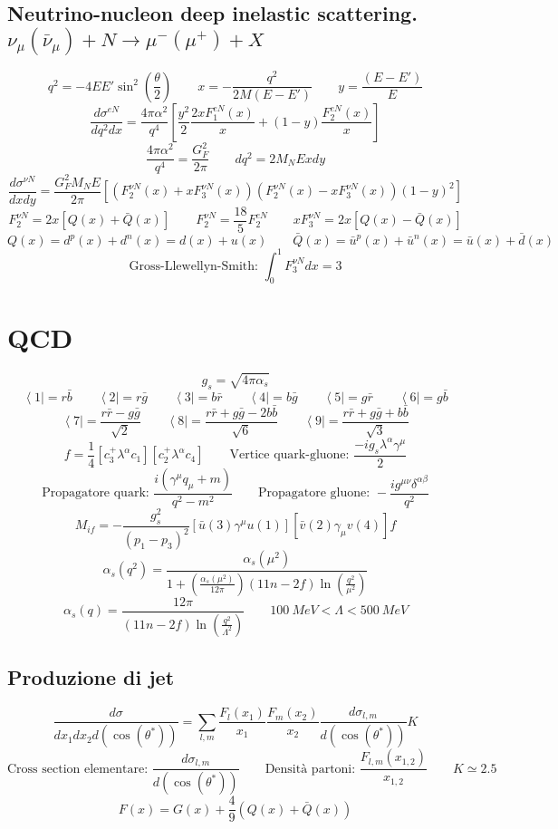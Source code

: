 \documentclass[10pt, onecolumn, a4paper]{article}
\def\({\left(}
\def\){\right)}
\def\[{\left[}
\def\]{\right]}
\def\<{\left<}
\begin{document}
\subsection{Neutrino-nucleon deep inelastic scattering. $\nu_{\mu}\(\bar\nu_{\mu}\)+N\to \mu^-\(\mu^+\)+X$} %
$$q^2=-4EE'\sin^2{\(\frac{\theta}{2}\)} \qquad x=-\frac{q^2}{2M\(E-E'\)} \qquad y=\frac{\(E-E'\)}{E}$$
$$\frac{d\sigma^{eN}}{dq^2dx}=\frac{4\pi\alpha^2}{q^4}\[\frac{y^2}{2}\frac{2xF_1^{eN}\(x\)}{x}+\(1-y\)\frac{F_2^{eN}\(x\)}{x}\]$$
$$\frac{4\pi\alpha^2}{q^4}=\frac{G_F^2}{2\pi} \qquad dq^2=2M_NExdy$$
$$\frac{d\sigma^{\nu N}}{dxdy}=\frac{G_F^2M_NE}{2\pi}\[\(F_2^{\nu N}\(x\)+xF_3^{\nu N}\(x\)\)\(F_2^{\nu N}\(x\)-xF_3^{\nu N}\(x\)\)\(1-y\)^2\]$$
$$F_2^{\nu N}=2x\[Q\(x\)+\bar Q\(x\)\] \qquad F_2^{\nu N}=\frac{18}{5}F_2^{eN} \qquad xF_3^{\nu N}=2x\[Q\(x\)-\bar Q\(x\)\]$$
$$Q\(x\)=d^p\(x\)+d^n\(x\)=d\(x\)+u\(x\) \qquad \bar Q\(x\)=\bar u^p\(x\)+\bar u^n\(x\)=\bar u\(x\)+\bar d\(x\)$$
$$\textrm{Gross-Llewellyn-Smith: } \int_0^1{F_3^{\nu N}dx}=3$$

\section{QCD} %
$$g_s=\sqrt{4\pi\alpha_s}$$
$$\<1 \right|=r \bar b \qquad \<2 \right|=r \bar g \qquad \< 3\right|=b \bar r \qquad \< 4\right|=b \bar g \qquad \< 5\right|=g \bar r \qquad \<6 \right|=g \bar b$$
$$\<7 \right|=\frac{r\bar r-g\bar g}{\sqrt{2}} \qquad \<8 \right|=\frac{r\bar r+g\bar g-2b\bar b}{\sqrt{6}} \qquad \<9 \right|=\frac{r\bar r+g\bar g+b\bar b}{\sqrt{3}}$$
$$f=\frac{1}{4}\[c_3^+\lambda^{\alpha}c_1\]\[c_2^+\lambda^{\alpha}c_4\] \qquad \textrm{Vertice quark-gluone: } \frac{-ig_s\lambda^{\alpha}\gamma^{\mu}}{2}$$
$$\textrm{Propagatore quark: } \frac{i\(\gamma^{\mu}q_{\mu}+m\)}{q^2-m^2} \qquad  \textrm{Propagatore gluone: } -\frac{ig^{\mu\nu}\delta^{\alpha\beta}}{q^2}$$
$$M_{if}=-\frac{g_s^2}{\(p_1-p_3\)^2}\[\bar u\(3\)\gamma^{\mu}u\(1\)\]\[\bar v\(2\)\gamma_{\mu}v\(4\)\]f$$
$$\alpha_s\(q^2\)=\frac{\alpha_s\(\mu^2\)}{1+\(\frac{\alpha_s\(\mu^2\)}{12\pi}\)\(11n-2f\)\ln{\(\frac{q^2}{\mu^2}\)}}$$
$$\alpha_s\(q\)=\frac{12\pi}{\(11n-2f\)\ln{\(\frac{q^2}{\Lambda^2}\)}} \qquad \SI{100}{MeV}<\Lambda<\SI{500}{MeV}$$

\subsection{Produzione di jet} %
$$\frac{d\sigma}{dx_1dx_2d\(\cos{\(\theta^*\)}\)}=\sum_{l,m}{\frac{F_l\(x_1\)}{x_1}\frac{F_m\(x_2\)}{x_2}\frac{d\sigma_{l,m}}{d\(\cos{\(\theta^*\)}\)}K}$$
$$\textrm{Cross section elementare: } \frac{d\sigma_{l,m}}{d\(\cos{\(\theta^*\)}\)} \qquad \textrm{Densità partoni: } \frac{F_{l,m}\(x_{1,2}\)}{x_{1,2}} \qquad K\simeq 2.5$$
$$F\(x\)=G\(x\)+\frac{4}{9}\(Q\(x\)+\bar Q\(x\)\)$$
\end{document}
